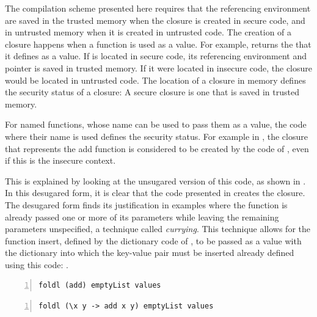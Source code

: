 The compilation scheme presented here requires that the referencing environment are saved in the trusted memory when the closure is created in secure code, and in untrusted memory when it is created in untrusted code.
The creation of a closure happens when a function is used as a value.
For example,  returns the  that it defines as a value.
If  is located in secure code, its referencing environment and pointer is saved in trusted memory.
If it were located in insecure code, the closure would be located in untrusted code.
The location of a closure in memory defines the security status of a closure: A secure closure is one that is saved in trusted memory.

\label{sec:OnlyLambdaClosures}
For named functions, whose name can be used to pass them as a value, the code where their name is used defines the security status.
For example in , the closure that represents the add function is considered to be created by the code of , even if this is the insecure context.

This is explained by looking at the unsugared version of this code, as shown in .
In this desugared form, it is clear that the code presented in  creates the closure.
The desugared form finds its justification in examples where the function is already passed one or more of its parameters while leaving the remaining parameters unspecified, a technique called \emph{currying}.
This technique allows for the function insert, defined by the dictionary code of , to be passed as a value with the dictionary into which the key-value pair must be inserted already defined using this code: .

\begin{lstlisting}[frame=single, language=ML,caption={[Predefined Function Passing]Passing a predefined function.}, label=code:implicit,numbers=left]
foldl (add) emptyList values
\end{lstlisting}

\begin{lstlisting}[frame=single, language=ML,caption={[Predefined Function Passing: Unsugared]Passing a predefined function, unsugared.}, label=code:explicit,numbers=left]
foldl (\x y -> add x y) emptyList values
\end{lstlisting}


